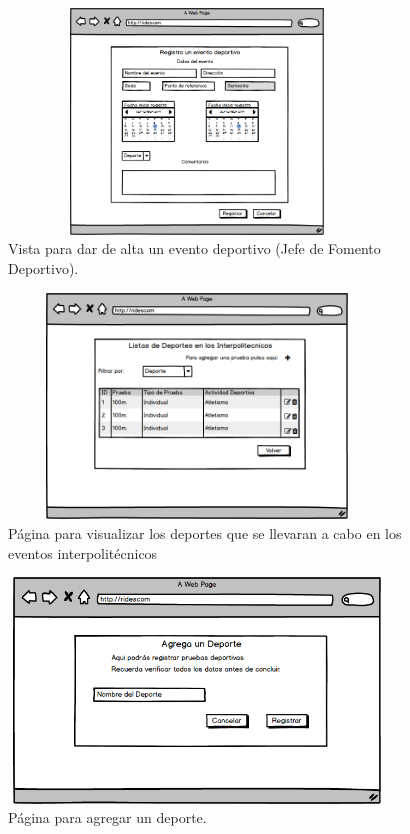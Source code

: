 		\begin{figure} [hbt!]
			\centering
			\includegraphics[width=10cm, height=6cm]{Imagenes/Nuevos/P4_Crear_evento_deportivo}
			\caption{Vista para dar de alta un evento deportivo (Jefe de Fomento Deportivo).}
			\label{creaevento}
		\end{figure}
		\pagebreak	
		
		\begin{figure} [hbt!]
			\centering
			\includegraphics[width=10cm, height=6cm]{Imagenes/Nuevos/P27_Deportes_JFD}
			\caption{Página para visualizar los deportes que se llevaran a cabo en los eventos interpolitécnicos}
			\label{deportes}
		\end{figure}
	
		\begin{figure} [hbt!]
			\centering
			\includegraphics[width=10cm, height=6cm]{Imagenes/Nuevos/P28_AgregarDeportes_JFD}
			\caption{Página para agregar un deporte.}
			\label{agregadeporte}
		\end{figure}
		
